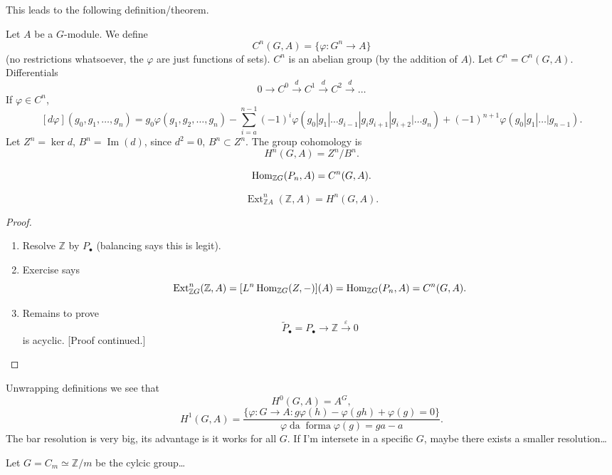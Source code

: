 \noindent
This leads to the following
definition/theorem.

\begin{definition}
\label{definition-group-cohomology}
Let $A$ be a $G$-module.
We define
$$
C^n(G,A)
=
\{\varphi:G^n\to A\}
$$
(no restrictions whatsoever, the $\varphi$
are just functions of sets).
$C^n$ is an abelian group (by the addition
of $A$). Let $C^n = C^n(G,A)$.
Differentials
$$
0\to C^0
\xrightarrow{d} C^1
\xrightarrow{d} C^2
\xrightarrow{d}…
$$
If $\varphi \in C^n$,
$$
[d\varphi](g_0,g_1,…,g_n)
=
g_0\varphi(g_1,g_2,…,g_n)
-
\sum_{i=a}^{n-1}
(-1)^i
\varphi(g_0|g_1|…g_{i-1}|g_ig_{i+1}|
g_{i+2}|…g_n)
+(-1)^{n+1}\varphi(g_0|g_1|…|g_{n-1}).
$$
Let $Z^n=\ker d$,
$B^n=\operatorname{Im}(d)$, since
$d^2=0$,  $B^n \subset Z^n$.
The group cohomology is
$$
H^n(G,A) = Z^n/B^n.
$$
\end{definition}

\begin{exercise}
\label{exercise-hom-group-cohom}
$$
\mathop{\mathrm{Hom}}\nolimits_{\mathbb{Z}G}(P_n,A)
=
C^n(G,A).
$$
\end{exercise}

\begin{theorem}
\label{theorem-ext-group-cohom}
$$
\operatorname{Ext}^n_{\mathbb{Z}A}(\mathbb{Z},A)
=
H^n(G,A).
$$
\end{theorem}

\begin{proof}
\begin{enumerate}
\item Resolve $\mathbb{Z}$ by 
$P_{\bullet}$ (balancing says this is
legit).

\item Exercise says
$$
\operatorname{Ext}^n_{\mathbb{Z}G}(\mathbb{Z},A)
=
[L^n\mathop{\mathrm{Hom}}\nolimits_{\mathbb{Z}G}(Z,-)](A)
=
\mathop{\mathrm{Hom}}\nolimits_{\mathbb{Z}G}(P_n,A)
=
C^n(G,A).
$$
\item Remains to prove
$$
\tilde{P}_\bullet=P_\bullet
\to \mathbb{Z}
\xrightarrow{\varepsilon}0
$$
is acyclic. [Proof continued.]
\end{enumerate}
\end{proof}

\noindent
Unwrapping definitions we see that
$$
H^0(G,A) = A^G,
$$
$$
H^1(G,A)
=
\frac{\{\varphi:G \to A:
g\varphi(h)-\varphi(gh)
+\varphi(g)=0\}}{
\varphi \operatorname{da}
\operatorname{forma}
\varphi(g)=ga-a}.
$$
The bar resolution is very big, its
advantage is it works for all $G$.
If I'm intersete in a specific $G$,
maybe there exists a smaller resolution…

\begin{example}
\label{example-group-cohom-cyclic}
Let $G = C_m \simeq \mathbb{Z}/m$
be the cylcic group…
\end{example}


